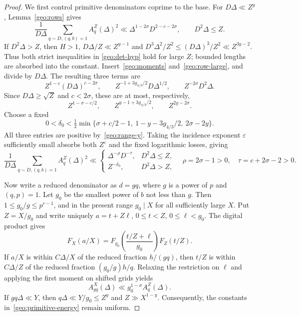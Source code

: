 \documentclass[11pt,a4paper]{article}
\theoremstyle{paperplain}
\numberwithin{equation}{section}
\begin{document}
\begin{proof}
We first control primitive denominators coprime to the base.
For $D\Delta\ll Z^y$, Lemma~\ref{geo:rows} gives
\begin{equation}\label{geo:small-energy}
 \frac1{D\Delta}\sum_{q\sim D,(q,b)=1}A_q^Z(\Delta)^2
 \ll\Delta^{1-2\sigma}D^{2-c-2\sigma},
 \qquad D^2\Delta\le Z.
\end{equation}
If $D^2\Delta>Z$, then $H>1$, $D\Delta/Z\ll Z^{y-1}$ and
$D^3\Delta^2/Z^2\le (D\Delta)^3/Z^2\ll Z^{3y-2}$. Thus both strict
inequalities in \eqref{geo:det-hyp} hold for large $Z$; bounded lengths
are absorbed into the constant.
Insert~\eqref{geo:moments} and~\eqref{geo:row-large}, and divide by $D\Delta$.
The resulting three terms are
\[
 Z^{1-c}(D\Delta)^{c-2\sigma},\qquad
 Z^{-1+3g_{4/3}/2}D\Delta^{1/2},\qquad
 Z^{-2\sigma}D^2\Delta.
\]
Since $D\Delta\ge\sqrt Z$ and $c<2\sigma$, these are at most, respectively,
\begin{equation}\label{geo:three-powers}
 Z^{1-\sigma-c/2},\qquad Z^{y-1+3g_{4/3}/2},\qquad
 Z^{2y-2\sigma}.
\end{equation}
Choose a fixed
\[
 0<\delta_0<
 \tfrac12\min\{\sigma+c/2-1,\ 1-y-3g_{4/3}/2,\ 2\sigma-2y\}.
\]
All three entries are positive by~\eqref{geo:range-y}.
Taking the incidence exponent $\varepsilon$ sufficiently small absorbs
both $Z^\varepsilon$ and the fixed logarithmic losses, giving
\begin{equation}\label{geo:primitive-energy}
 \frac1{D\Delta}\sum_{q\sim D,(q,b)=1}A_q^Z(\Delta)^2
 \ll
 \begin{cases}
 \Delta^{-\rho}D^{-\tau},&D^2\Delta\le Z,\\
 Z^{-\delta_0},&D^2\Delta>Z,
 \end{cases}
 \quad
 \rho=2\sigma-1>0,\quad\tau=c+2\sigma-2>0.
\end{equation}

Now write a reduced denominator as $d=gq$, where $g$ is a power of $p$ and
$(q,p)=1$. Let $g_0$ be the smallest power of $b$ not less than $g$.
Then $1\le g_0/g\le p^{r-1}$, and in the present range $g_0\mid X$ for all
sufficiently large $X$.
Put $Z=X/g_0$ and write uniquely
$a=t+Z\ell$, $0\le t<Z$, $0\le\ell<g_0$.
The digital product gives
\begin{equation}\label{geo:smooth-fiber}
 F_X(a/X)=F_{g_0}\left(\frac{t/Z+\ell}{g_0}\right)F_Z(t/Z).
\end{equation}
If $a/X$ is within $C\Delta/X$ of the reduced fraction $h/(gq)$, then $t/Z$
is within $C\Delta/Z$ of the reduced fraction $(g_0/g)h/q$.
Relaxing the restriction on $\ell$ and applying the first moment on shifted
grids yields
\begin{equation}\label{geo:fiber-row}
 A_{gq}^X(\Delta)\ll g_0^{1-\sigma}A_q^Z(\Delta).
\end{equation}
If $gq\Delta\ll Y$, then
$q\Delta\ll Y/g_0\le Z^y$ and $Z\gg X^{1-y}$.
Consequently, the constants in~\eqref{geo:primitive-energy} remain uniform.


\end{proof}
\end{document}
